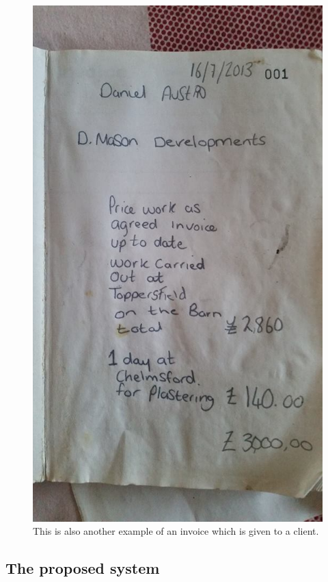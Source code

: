 \begin{figure}[H]
    \includegraphics[scale=0.5]{./Analysis/images/invoice3.jpg}
    \caption{This is also another example of an invoice which is given to a client.} \label{fig:invoice}
\end{figure}

\subsection{The proposed system}

